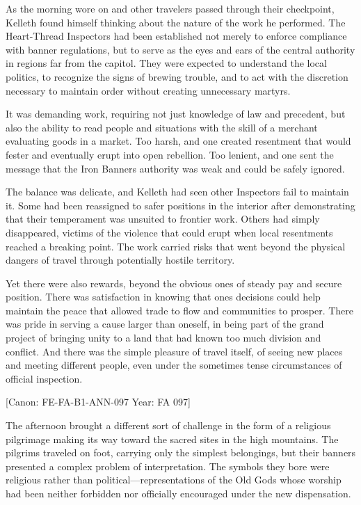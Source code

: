 As the morning wore on and other travelers passed through their
checkpoint, Kelleth found himself thinking about the nature of the work
he performed. The Heart-Thread Inspectors had been established not
merely to enforce compliance with banner regulations, but to serve as
the eyes and ears of the central authority in regions far from the
capitol. They were expected to understand the local politics, to
recognize the signs of brewing trouble, and to act with the discretion
necessary to maintain order without creating unnecessary martyrs.

It was demanding work, requiring not just knowledge of law and
precedent, but also the ability to read people and situations with the
skill of a merchant evaluating goods in a market. Too harsh, and one
created resentment that would fester and eventually erupt into open
rebellion. Too lenient, and one sent the message that the Iron
Banner\textquotesingle s authority was weak and could be safely ignored.

The balance was delicate, and Kelleth had seen other Inspectors fail to
maintain it. Some had been reassigned to safer positions in the interior
after demonstrating that their temperament was unsuited to frontier
work. Others had simply disappeared, victims of the violence that could
erupt when local resentments reached a breaking point. The work carried
risks that went beyond the physical dangers of travel through
potentially hostile territory.

Yet there were also rewards, beyond the obvious ones of steady pay and
secure position. There was satisfaction in knowing that
one\textquotesingle s decisions could help maintain the peace that
allowed trade to flow and communities to prosper. There was pride in
serving a cause larger than oneself, in being part of the grand project
of bringing unity to a land that had known too much division and
conflict. And there was the simple pleasure of travel itself, of seeing
new places and meeting different people, even under the sometimes tense
circumstances of official inspection.

{[}Canon: FE-FA-B1-ANN-097 \textbar{} Year: FA 097{]}

The afternoon brought a different sort of challenge in the form of a
religious pilgrimage making its way toward the sacred sites in the high
mountains. The pilgrims traveled on foot, carrying only the simplest
belongings, but their banners presented a complex problem of
interpretation. The symbols they bore were religious rather than
political---representations of the Old Gods whose worship had been
neither forbidden nor officially encouraged under the new dispensation.

